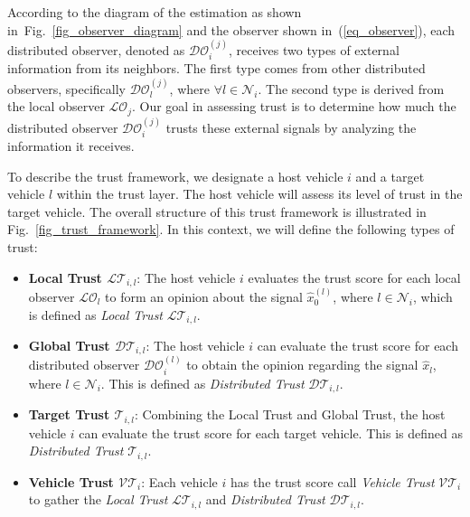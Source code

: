 \documentclass[letterpaper, 10pt, conference]{ieeeconf}  %
\def\eqref#1{(\ref{#1})}
\def\N{\mathcal{N}} %
\def\LO{\mathcal{LO}} %
\def\DO{\mathcal{DO}} %
\def\LT{\mathcal{LT}} %
\def\DT{\mathcal{DT}} %
\def\VT{\mathcal{VT}} %
\def\T{\mathcal{T}} %
\begin{document}
According to the diagram of the estimation as shown in~Fig.~\ref{fig_observer_diagram} and the observer shown in~\eqref{eq_observer}, each distributed observer, denoted as $\DO_{i}^{(j)}$, receives two types of external information from its neighbors. The first type comes from other distributed observers, specifically $\DO_{l}^{(j)}$, where $\forall l \in {\N}_{i}$. The second type is derived from the local observer $\LO_{j}$. Our goal in assessing trust is to determine how much the distributed observer $\DO_{i}^{(j)}$ trusts these external signals by analyzing the information it receives.

To describe the trust framework, we designate a host vehicle $i$ and a target vehicle $l$  within the trust layer. The host vehicle will assess its level of trust in the target vehicle. The overall structure of this trust framework is illustrated in Fig.~\ref{fig_trust_framework}. In this context, we will define the following types of trust:
\begin{itemize}
    \item \textbf{Local Trust $\LT_{i,l}$}: The host vehicle $i$ evaluates the trust score for each local observer $\LO_{l}$ to form an opinion about the signal $\hat{x}_{0}^{(l)}$, where $l \in \N_{i}$, which is defined as \textit{Local Trust} $\LT_{i,l}$.
    \item \textbf{Global Trust $\DT_{i,l}$}: The host vehicle $i$ can evaluate the trust score for each distributed observer $\DO_{i}^{(l)}$ to obtain the opinion regarding the signal $\hat{x}_{l}$, where $l \in \N_{i}$. This is defined as \textit{Distributed Trust} $\DT_{i,l}$.
    \item \textbf{Target Trust $\T_{i,l}$}: Combining the Local Trust and Global Trust,  the host vehicle $i$ can evaluate the trust score for each target vehicle. This is defined as \textit{Distributed Trust} $\T_{i,l}$.
    \item \textbf{Vehicle Trust $\VT_{i}$}: Each vehicle $i$ has the trust score call \textit{Vehicle Trust} $\VT_{i}$ to gather the \textit{Local Trust} $\LT_{i,l}$ and \textit{Distributed Trust} $\DT_{i,l}$. 
\end{itemize}
\end{document}
